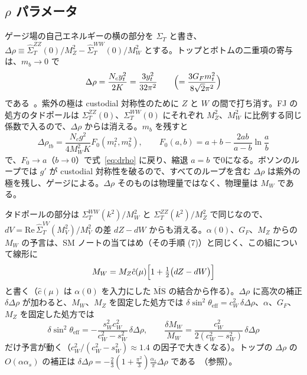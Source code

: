 \documentclass[a4paper,10pt]{ltjsarticle}
\newcommand{\MSbar}{\overline{\mathrm{MS}}}
\newcommand{\re}{\mathrm{Re}\,}
\begin{document}
\subsection{$\rho$ パラメータ}\label{sec:rho}

ゲージ場の自己エネルギーの横の部分を $\Sigma_T$ と書き、$\Delta\rho\equiv\hat\Sigma^{ZZ}_T(0)/M_Z^2-\hat\Sigma^{WW}_T(0)/M_W^2$ とする。トップとボトムの二重項の寄与は、$m_b\to0$ で
\begin{equation}
\Delta\rho=\frac{N_cy_t^2}{2K}=\frac{3y_t^2}{32\pi^2}\qquad\Bigl(=\frac{3G_Fm_t^2}{8\sqrt2\pi^2}\Bigr)
\label{eq:drho}
\end{equation}
である~\cite{veltman77}。紫外の極は custodial 対称性のために $Z$ と $W$ の間で打ち消す。FJ の処方のタドポールは $\Sigma^{ZZ}_T(0)$、$\Sigma^{WW}_T(0)$ にそれぞれ $M_Z^2$、$M_W^2$ に比例する同じ係数で入るので、$\Delta\rho$ からは消える。$m_b$ を残すと
\begin{equation}
\Delta\rho_{tb}=\frac{N_cg^2}{4M_W^2K}F_0(m_t^2,m_b^2),\qquad F_0(a,b)=a+b-\frac{2ab}{a-b}\ln\frac ab
\label{eq:drhof0}
\end{equation}
で、$F_0\to a$（$b\to0$）で式~\eqref{eq:drho} に戻り、縮退 $a=b$ で0になる。ボソンのループでは $g'$ が custodial 対称性を破るので、すべてのループを含む $\Delta\rho$ は紫外の極を残し、ゲージによる。$\Delta\rho$ そのものは物理量ではなく、物理量は $M_W$ である。

タドポールの部分は $\Sigma^{WW}_T(k^2)/M_W^2$ と $\Sigma^{ZZ}_T(k^2)/M_Z^2$ で同じなので、$dV=\re\hat\Sigma^{VV}_T(M_V^2)/M_V^2$ の差 $dZ-dW$ からも消える。$\alpha(0)$、$G_F$、$M_Z$ からの $M_W$ の予言は、SM ノートの当てはめ（その手順 (7)）と同じく、この組について線形に
\begin{equation}
M_W=M_Z\hat c(\mu)\Bigl[1+\tfrac12\bigl(dZ-dW\bigr)\Bigr]
\label{eq:mwpred}
\end{equation}
と書く（$\hat c(\mu)$ は $\alpha(0)$ を入力にした $\MSbar$ の結合から作る）。$\Delta\rho$ に高次の補正 $\delta\Delta\rho$ が加わると、$M_W$、$M_Z$ を固定した処方では $\delta\sin^2\theta_{\mathrm{eff}}=c_W^2\,\delta\Delta\rho$、$\alpha$、$G_F$、$M_Z$ を固定した処方では
\begin{equation}
\delta\sin^2\theta_{\mathrm{eff}}=-\frac{s_W^2c_W^2}{c_W^2-s_W^2}\,\delta\Delta\rho,\qquad \frac{\delta M_W}{M_W}=\frac{c_W^2}{2(c_W^2-s_W^2)}\,\delta\Delta\rho
\label{eq:drhosens}
\end{equation}
だけ予言が動く（$c_W^2/(c_W^2-s_W^2)\approx1.4$ の因子で大きくなる）。トップの $\Delta\rho$ の $O(\alpha\alpha_s)$ の補正は $\delta\Delta\rho=-\frac23(1+\frac{\pi^2}3)\frac{\alpha_s}\pi\Delta\rho$ である~\cite{dv87}（参照）。
\end{document}
